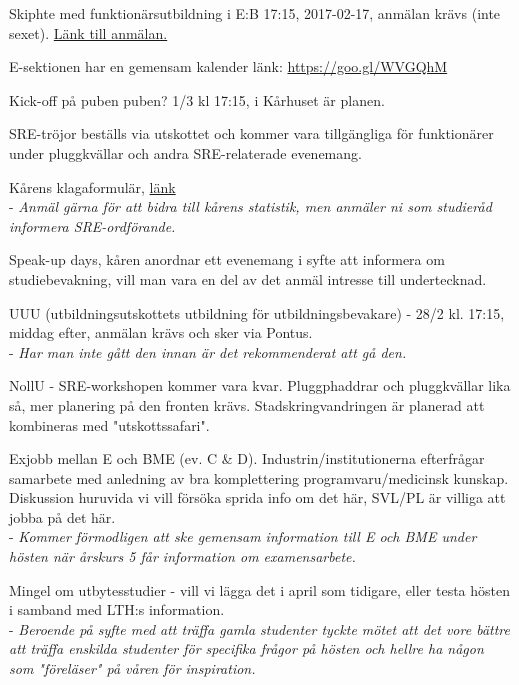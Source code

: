 \documentclass[10pt]{article}
\begin{document}
\begin{paragrafer}
\item Skiphte med funktionärsutbildning i E:B 17:15, 2017-02-17, anmälan krävs (inte sexet). \href{https://goo.gl/SzgpMm}{Länk till anmälan.}

\item E-sektionen har en gemensam kalender länk: \url{https://goo.gl/WVGQhM}

\item Kick-off på puben puben? 
1/3 kl 17:15, i Kårhuset är planen.

\item SRE-tröjor beställs via utskottet och kommer vara tillgängliga för funktionärer under pluggkvällar och andra SRE-relaterade evenemang.

\item Kårens klagaformulär, \href{https://tlth.se/klaga}{länk} \\ - \textit{Anmäl gärna för att bidra till kårens statistik, men anmäler ni som studieråd informera SRE-ordförande.} 

\item Speak-up days, kåren anordnar ett evenemang i syfte att informera om studiebevakning, vill man vara en del av det anmäl intresse till undertecknad.

\item UUU (utbildningsutskottets utbildning för utbildningsbevakare) - 28/2 kl. 17:15, middag efter, anmälan krävs och sker via Pontus. \\- \textit{Har man inte gått den innan är det rekommenderat att gå den.} 

\item NollU - SRE-workshopen kommer vara kvar. Pluggphaddrar och pluggkvällar lika så, mer planering på den fronten krävs. Stadskringvandringen är planerad att kombineras med "utskottssafari".

\item Exjobb mellan E och BME (ev. C \& D). Industrin/institutionerna efterfrågar samarbete med anledning av bra komplettering programvaru/medicinsk kunskap. Diskussion huruvida vi vill försöka sprida info om det här, SVL/PL är villiga att jobba på det här.\\ - \textit{Kommer förmodligen att ske gemensam information till E och BME under hösten när årskurs 5 får information om examensarbete.}

\item Mingel om utbytesstudier - vill vi lägga det i april som tidigare, eller testa hösten i samband med LTH:s information.\\ - \textit{Beroende på syfte med att träffa gamla studenter tyckte mötet att det vore bättre att träffa enskilda studenter för specifika frågor på hösten och hellre ha någon som "föreläser" på våren för inspiration.}


\end{paragrafer}
\end{document}

